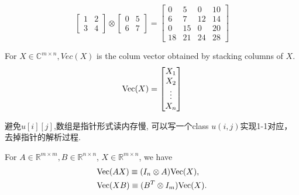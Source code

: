 \begin{exm}
  \begin{displaymath}
    \begin{bmatrix}
      1 & 2 \\
      3 & 4
    \end{bmatrix}\otimes
    \begin{bmatrix}
      0 & 5\\
      6 & 7
    \end{bmatrix}
=
\begin{bmatrix}
  0 & 5 & 0 & 10\\
  6 & 7 & 12 & 14 \\
  0 & 15 & 0 & 20 \\
  18 & 21 & 24 & 28 
\end{bmatrix}
  \end{displaymath}
\end{exm}

\begin{defn}
  For $X\in \mathbb{C}^{m\times n},
  Vec(X)$ is the colum vector obtained by
  stacking columns of $X$.
  \begin{equation}
    \textmd{Vec}(X)=
    \begin{bmatrix}
      X_1\\
      X_2\\
      \vdots\\
      X_n
    \end{bmatrix}
  \end{equation}
\end{defn}

\begin{CJK*}{UTF8}{gkai}
  \begin{rem}
    避免$u[i][j]$,数组是指针形式读内存慢,
    可以写一个class $u(i,j)$实现1-1对应，去掉指针的解析过程.
  \end{rem}
\end{CJK*}

\begin{thm}
  \label{thm:Vec}
  For $A\in \mathbb{R}^{m\times m},B\in \mathbb{R}^{n\times n}$,
  $X\in \mathbb{R}^{m\times n}$,
  we have
  \begin{subequations}
    \begin{align}
      & \textmd{Vec}(AX) \equiv (I_n\otimes A)\textmd{Vec}(X),
      \label{eq:AX}\\
      & \textmd{Vec}(XB) \equiv (B^T\otimes I_m)\textmd{Vec}(X).
        \label{eq:XB}
    \end{align}
  \end{subequations}
\end{thm}

